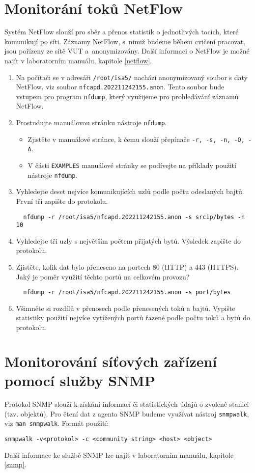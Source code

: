 \documentclass[a4paper,11pt]{article}
\begin{document}
\section{Monitorání toků NetFlow}
Systém NetFlow slouží pro sběr a přenos statistik o jednotlivých tocích, které komunikují po síti. Záznamy NetFlow, s~nimiž budeme během cvičení pracovat, jsou pořízeny ze sítě VUT a~anonymizovány. Další informaci o NetFlow je možné najít v laboratorním manuálu, kapitole \ref{netflow}.
\begin{enumerate}
  \item Na počítači se v adresáři {\tt /root/isa5/} nachází anonymizovaný soubor s daty NetFlow, viz soubor \texttt{nfcapd.202211242155.anon}. Tento soubor bude vstupem pro program  {\tt nfdump}, který využijeme pro prohledávání záznamů NetFlow.
  \item Prostudujte manuálovou stránku nástroje {\tt nfdump}.
    \begin{itemize}
      \item Zjistěte v manuálové stránce, k čemu slouží přepínače {\tt -r, -s, -n, -O, -A}.
      \item V části {\tt EXAMPLES} manuálové stránky se podívejte na příklady použití nástroje {\tt nfdump}.
    \end{itemize}
  \item Vyhledejte deset nejvíce komunikujících uzlů podle počtu odeslaných bajtů. První tři zapište do protokolu. 
\begin{verbatim}
  nfdump -r /root/isa5/nfcapd.202211242155.anon -s srcip/bytes -n 10
\end{verbatim}
  \item Vyhledejte tři uzly s největším počtem přijatých bytů. Výsledek zapište do protokolu.
  \item Zjistěte, kolik dat bylo přeneseno na portech 80 (HTTP) a 443 (HTTPS). Jaký je poměr využití těchto portů na celkovém provozu?
\begin{verbatim}
  nfdump -r /root/isa5/nfcapd.202211242155.anon -s port/bytes 
\end{verbatim}
  \item Všimněte si rozdílů v přenosech podle přenesených toků a bajtů. Vypište statistiky použití nejvíce vytížených portů řazené podle počtu toků a bytů do protokolu.
\end{enumerate}

\section{Monitorování síťových zařízení pomocí služby SNMP}
Protokol SNMP slouží k získání informací či statistických údajů o zvolené stanici (tzv. objektů). Pro čtení dat z agenta SNMP budeme využívat nástroj \texttt{snmpwalk}, viz \texttt{man snmpwalk}. Formát použití:
\begin{verbatim}
snmpwalk -v<protokol> -c <community string> <host> <object>
\end{verbatim}
Další informace ke službě SNMP lze najít v laboratorním manuálu, kapitole \ref{snmp}. 
\end{document}
